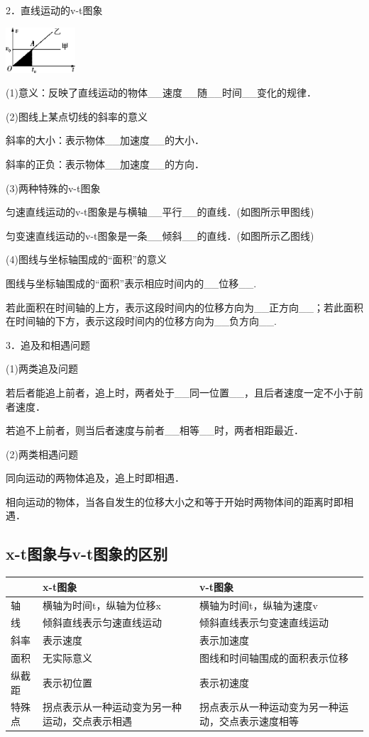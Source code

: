 2．直线运动的v-t图象

\begin{center}\includegraphics[width=1.02083in,height=0.66667in]{media/image30.png}\end{center}
	

(1)意义：反映了直线运动的物体\_\_速度\_\_随\_\_时间\_\_变化的规律．

(2)图线上某点切线的斜率的意义

斜率的大小：表示物体\_\_加速度\_\_的大小．

斜率的正负：表示物体\_\_加速度\_\_的方向．

(3)两种特殊的v-t图象

匀速直线运动的v-t图象是与横轴\_\_平行\_\_的直线．(如图所示甲图线)

匀变速直线运动的v-t图象是一条\_\_倾斜\_\_的直线．(如图所示乙图线)

(4)图线与坐标轴围成的``面积''的意义

图线与坐标轴围成的``面积''表示相应时间内的\_\_位移\_\_.

若此面积在时间轴的上方，表示这段时间内的位移方向为\_\_正方向\_\_；若此面积在时间轴的下方，表示这段时间内的位移方向为\_\_负方向\_\_.

3．追及和相遇问题

(1)两类追及问题

若后者能追上前者，追上时，两者处于\_\_同一位置\_\_，且后者速度一定不小于前者速度．

若追不上前者，则当后者速度与前者\_\_相等\_\_时，两者相距最近．

(2)两类相遇问题

同向运动的两物体追及，追上时即相遇．

相向运动的物体，当各自发生的位移大小之和等于开始时两物体间的距离时即相遇．

\newpage
\subsection{x-t图象与v-t图象的区别}

\begin{longtable}[]{@{}m{1.5cm}m{6cm}m{6cm}@{}}
\toprule
& x-t图象 & v-t图象\tabularnewline
\midrule
\endhead
轴 & 横轴为时间t，纵轴为位移x & 横轴为时间t，纵轴为速度v\tabularnewline
线 & 倾斜直线表示匀速直线运动 &
倾斜直线表示匀变速直线运动\tabularnewline
斜率 & 表示速度 & 表示加速度\tabularnewline
面积 & 无实际意义 & 图线和时间轴围成的面积表示位移\tabularnewline
纵截距 & 表示初位置 & 表示初速度\tabularnewline
特殊点 & 拐点表示从一种运动变为另一种运动，交点表示相遇 &
拐点表示从一种运动变为另一种运动，交点表示速度相等\tabularnewline
\bottomrule
\end{longtable}

